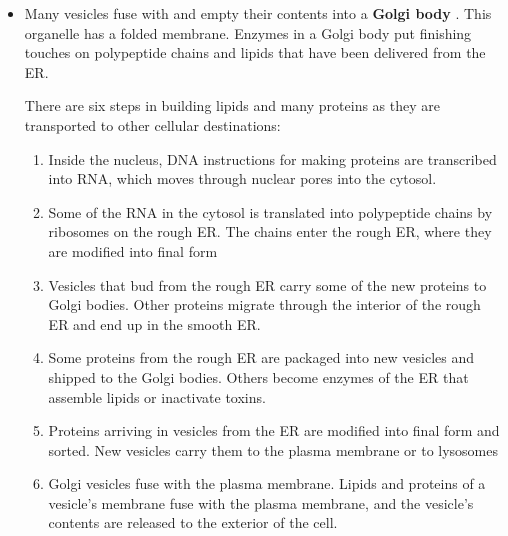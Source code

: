 \documentclass[letterpaper]{article}
\numberwithin{equation}{section}
\theoremstyle{classic}
\begin{document}
\begin{itemize}
    \item Many vesicles fuse with and empty their contents into a \textbf{Golgi body} . This organelle has a folded membrane. Enzymes in a Golgi body put finishing touches on polypeptide chains and lipids that have been delivered from the ER.
    \begin{review}
        There are six steps in building lipids and many proteins as they are transported to other cellular destinations:
        \begin{enumerate}
            \item Inside the nucleus, DNA instructions for making proteins are transcribed into RNA, which moves through nuclear pores into the cytosol.
            \item Some of the RNA in the cytosol is translated into polypeptide chains by ribosomes on the rough ER. The chains enter the rough ER, where they are modified into final form
            \item Vesicles that bud from the rough ER carry some of the new
            proteins to Golgi bodies. Other proteins migrate through the interior of the rough ER and end up in the smooth ER.
            \item Some proteins from the rough ER are packaged into new vesicles and shipped to the Golgi bodies. Others become enzymes of the ER that assemble lipids or inactivate toxins.
            \item Proteins arriving in vesicles from the ER are modified into final form and sorted. New vesicles carry them to the plasma membrane or to lysosomes
            \item Golgi vesicles fuse with the plasma membrane. Lipids and proteins of a vesicle's membrane fuse with the plasma membrane, and the vesicle’s contents are released to the exterior of the cell.
        \end{enumerate}
    \end{review}

\end{itemize}
\end{document}
